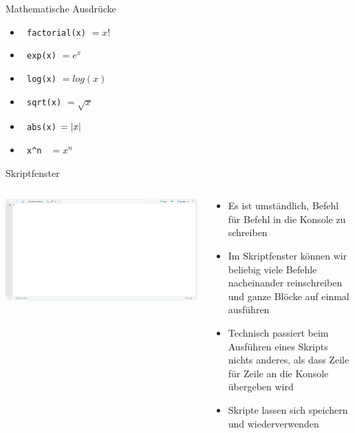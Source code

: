 \documentclass[aspectratio = 169]{chariteBeamer}
\begin{document}
\begin{frame}[fragile]{Mathematische Ausdrücke}
	\begin{itemize}
		\item \verb+ factorial(x)+ $= x!$
		\item \verb+ exp(x)+ $=e^x$
		\item \verb+ log(x)+ $=log(x)$
		\item \verb+ sqrt(x)+ $=\sqrt{x}$
		\item \verb+ abs(x)+ $=\left\lvert x \right\rvert$
		\item \verb+ x^n + $=x^n$
	\end{itemize}
\end{frame}

\begin{frame}{Skriptfenster}
	\begin{columns}[T]
	\begin{column}{0.6\textwidth}
	\includegraphics[width=\textwidth]{Rstudio_interface_i}
	\end{column}
	\begin{column}{0.4\textwidth}
	\begin{itemize}
		\item \small Es ist umständlich, Befehl für Befehl in die Konsole zu schreiben
		\item \small Im Skriptfenster können wir beliebig viele Befehle nacheinander reinschreiben und ganze Blöcke auf einmal ausführen
		\item \small Technisch passiert beim Ausführen eines Skripts nichts anderes, als dass Zeile für Zeile an die Konsole übergeben wird
		\item \small Skripte lassen sich speichern und wiederverwenden
	\end{itemize}
	\end{column}
\end{columns}
\end{frame}
\end{document}
